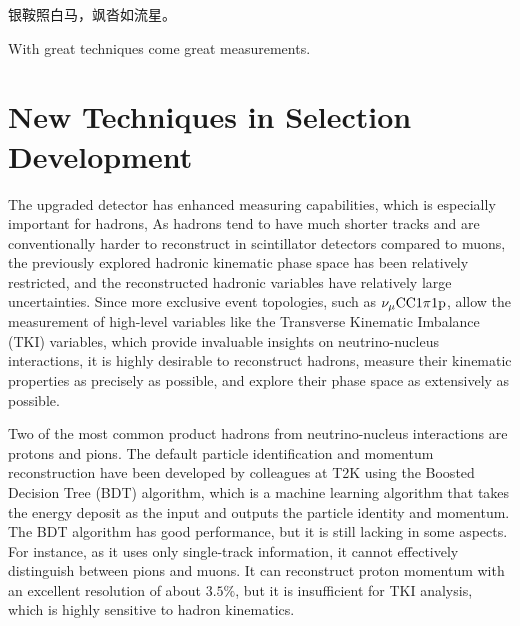 \begin{savequote}[8cm]
\begin{CJK*}{UTF8}{gbsn}
  银鞍照白马，飒沓如流星。
\end{CJK*}

With great techniques come great measurements.

\end{savequote}

\chapter{\label{ch:techniques}New Techniques in Selection Development} 
\minitoc

The upgraded detector has enhanced measuring capabilities, which is especially important for hadrons,
As hadrons tend to have much shorter tracks and are conventionally harder to reconstruct in scintillator detectors compared to muons, the previously explored hadronic kinematic phase space has been relatively restricted, and the reconstructed hadronic variables have relatively large uncertainties.
Since more exclusive event topologies, such as $\nu_{\mu}\textrm{CC}1\pi1\textrm{p}$, allow the measurement of high-level variables like the Transverse Kinematic Imbalance (TKI) variables, which provide invaluable insights on neutrino-nucleus interactions, it is highly desirable to reconstruct hadrons, measure their kinematic properties as precisely as possible, and explore their phase space as extensively as possible.

Two of the most common product hadrons from neutrino-nucleus interactions are protons and pions. 
The default particle identification and momentum reconstruction have been developed by colleagues at T2K using the Boosted Decision Tree (BDT) algorithm, which is a machine learning algorithm that takes the energy deposit as the input and outputs the particle identity and momentum. 
The BDT algorithm has good performance, but it is still lacking in some aspects.
For instance, as it uses only single-track information, it cannot effectively distinguish between pions and muons. 
It can reconstruct proton momentum with an excellent resolution of about $3.5\%$, but it is insufficient for TKI analysis, which is highly sensitive to hadron kinematics. 


